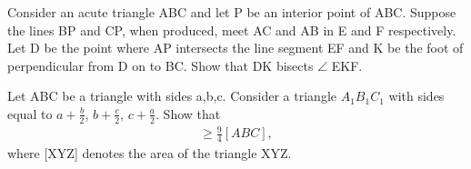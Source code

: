\item Consider an acute triangle ABC and let P be an interior point of ABC. Suppose the lines BP and CP, when produced, meet AC and AB in E and F respectively. Let D be the point where AP intersects the line segment EF and K be the foot of perpendicular from D on to BC. Show that DK bisects $\angle$ EKF.

\item Let ABC be a triangle with sides a,b,c. Consider a triangle $A_1B_1C_1$ with sides equal to $a + \frac{b}{2}$, $b + \frac{c}{2}$, $c + \frac{a}{2}$. Show that
\begin{align*}
[A_1B_1C_1] \geq \frac{9}{4}[ABC],
\end{align*}
where [XYZ] denotes the area of the triangle XYZ.






















